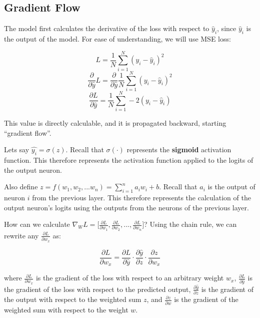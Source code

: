 \subsection{Gradient Flow}
\begin{flushleft}
    \large The model first calculates the derivative of the loss with respect to $\hat{y}_i$, since $\hat{y}_i$ is the output of the model. For ease of understanding, we will use MSE loss:

    $$L = \frac{1}{N} \sum^{N}_{i=1} (y_i - \hat{y}_i)^2$$
    $$\frac{\partial}{\partial \hat{y}} L = \frac{\partial}{\partial \hat{y}}  \frac{1}{N} \sum^{N}_{i=1} (y_i - \hat{y}_i)^2$$
    $$\frac{\partial L}{\partial \hat{y}} =  \frac{1}{N} \sum^{N}_{i=1} -2(y_i - \hat{y}_i)$$

    This value is directly calculable, and it is propagated backward, starting ``gradient flow''. \break

    Lets say $\hat{y_i} = \sigma(z)$. Recall that $\sigma(\cdot)$ represents the \textbf{sigmoid} activation function. This therefore represents the activation function applied to the logits of the output neuron. \break
    
    Also define $z = f(w_1, w_2, ... w_n) = \sum_{i=1}^n a_iw_i + b$. Recall that $a_i$ is the output of neuron $i$ from the previous layer. This therefore represents the calculation of the output neuron's logits using the outputs from the neurons of the previous layer. \break
    


    How can we calculate $\nabla_W L = \biggl[ \frac{\partial L}{\partial w_1}, \frac{\partial L}{\partial w_2},...,  \frac{\partial L}{\partial w_n}\biggr]$? Using the chain rule, we can rewrite any $\frac{\partial L}{\partial w_x}$ as:

    $$\frac{\partial L}{\partial w_x} = \frac{\partial L}{\partial \hat{y}}\cdot\frac{\partial \hat{y}}{\partial z}\cdot\frac{\partial z}{\partial w_x}$$
    
    where $\frac{\partial L}{\partial w_x}$ is the gradient of the loss with respect to an arbitrary weight $w_x$, $\frac{\partial L}{\partial\hat{y}}$ is the gradient of the loss with respect to the predicted output, $\frac{\partial\hat{y}}{\partial z}$ is the gradient of the output with respect to the weighted sum $z$, and $\frac{\partial z}{\partial w}$ is the gradient of the weighted sum with respect to the weight $w$. \break


\end{flushleft}

